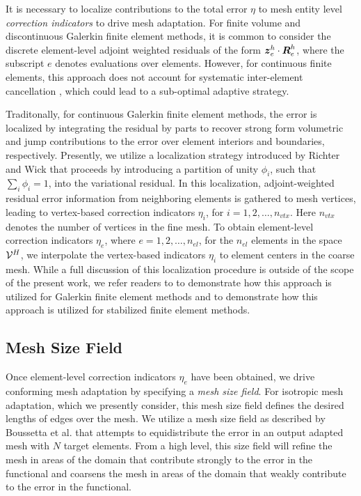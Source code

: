 It is necessary to localize contributions to the 
total error $\eta$ to mesh entity level \emph{correction indicators}
to drive mesh adaptation. For finite volume and discontinuous
Galerkin finite element methods, it is common to consider the discrete
element-level adjoint weighted residuals of the form
$\boldsymbol{z}^h_e \cdot \boldsymbol{R}^h_e$, where the subscript $e$ denotes evaluations
over elements. However, for continuous finite elements, this approach
does not account for systematic inter-element cancellation
\cite{fidkowski2011review}, which could lead to a sub-optimal adaptive
strategy.

Traditonally, for continuous Galerkin finite element methods, the
error is localized by integrating the residual by parts to recover
strong form volumetric and jump contributions to the error over
element interiors and boundaries, respectively. Presently, we utilize
a localization strategy introduced by Richter and Wick
\cite{richter2015variational} that proceeds by introducing a
partition of unity $\phi_i$, such that $\sum_i \phi_i = 1$, into the
variational residual. In this localization, adjoint-weighted residual
error information from neighboring elements is gathered to mesh
vertices, leading to vertex-based correction indicators $\eta_i$,
for $i = 1, 2, \dots, n_{vtx}$. Here $n_{vtx}$ denotes the number
of vertices in the fine mesh. To obtain element-level correction
indicators $\eta_e$, where $e = 1,2, \dots, n_{el}$, for the $n_{el}$
elements in the space $\mathcal{V}^H$, we interpolate the vertex-based
indicators $\eta_i$ to element centers in the coarse mesh.
While a full discussion of this localization procedure is outside
of the scope of the present work, we refer readers to
\cite{richter2015variational, wick2016goal} to demonstrate how this
approach is utilized for Galerkin finite element methods and
\cite{granzow2017adjoint} to demonstrate how this approach is
utilized for stabilized finite element methods.

\subsection{Mesh Size Field}

Once element-level correction indicators $\eta_e$ have been obtained, we
drive conforming mesh adaptation by specifying a \emph{mesh size field}.
For isotropic mesh adaptation, which we presently consider, this mesh size
field defines the desired lengths of edges over the mesh. We utilize a mesh
size field as described by Boussetta et al. \cite{boussetta2006adaptive}
that attempts to equidistribute the error in an output adapted mesh with
$N$ target elements. From a high level, this size field will refine the mesh
in areas of the domain that contribute strongly to the error in the functional
and coarsens the mesh in areas of the domain that weakly contribute to the
error in the functional.


